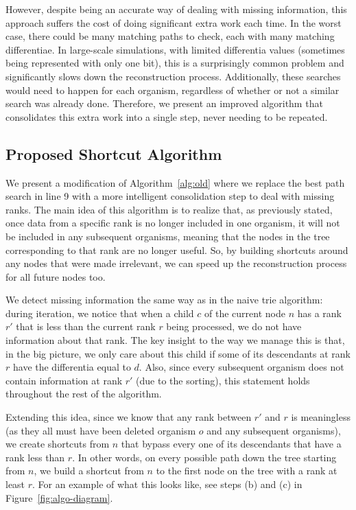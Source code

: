 However, despite being an accurate way of dealing with missing information, this approach suffers the cost of doing significant extra work each time.
In the worst case, there could be many matching paths to check, each with many matching differentiae.
In large-scale simulations, with limited differentia values (sometimes being represented with only one bit), this is a surprisingly common problem and significantly slows down the reconstruction process.
Additionally, these searches would need to happen for each organism, regardless of whether or not a similar search was already done.
Therefore, we present an improved algorithm that consolidates this extra work into a single step, never needing to be repeated.

\subsection{Proposed Shortcut Algorithm} \label{sec:algorithm:shortcut}

We present a modification of Algorithm~\ref{alg:old} where we replace the best path search in line 9 with a more intelligent consolidation step to deal with missing ranks. The main idea of this algorithm is to realize that, as previously stated, once data from a specific rank is no longer included in one organism, it will not be included in any subsequent organisms, meaning that the nodes in the tree corresponding to that rank are no longer useful. So, by building shortcuts around any nodes that were made irrelevant, we can speed up the reconstruction process for all future nodes too.

We detect missing information the same way as in the naive trie algorithm: during iteration, we notice that when a child $c$ of the current node $n$ has a rank $r'$ that is less than the current rank $r$ being processed, we do not have information about that rank. The key insight to the way we manage this is that, in the big picture, we only care about this child if some of its descendants at rank $r$ have the differentia equal to $d$. Also, since every subsequent organism does not contain information at rank $r'$ (due to the sorting), this statement holds throughout the rest of the algorithm.



Extending this idea, since we know that any rank between $r'$ and $r$ is meaningless (as they all must have been deleted organism $o$ and any subsequent organisms), we create shortcuts from $n$ that bypass every one of its descendants that have a rank less than $r$.
In other words, on every possible path down the tree starting from $n$, we build a shortcut from $n$ to the first node on the tree with a rank at least $r$. For an example of what this looks like, see steps (b) and (c) in Figure~\ref{fig:algo-diagram}.

